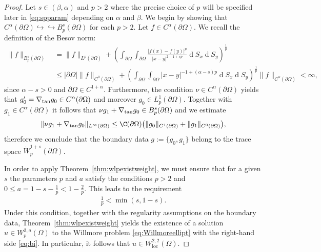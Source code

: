 \documentclass[12pt,a4paper,twoside]{article}
\newcommand{\diff}{\operatorname{d}\!}
\begin{document}
\begin{proof} 
Let $s\in(\beta,\alpha) $ and $p>2$  where the precise choice of $p$ will be specified later in \eqref{eq:spparam} depending on $\alpha$ and $\beta$.
We begin by showing that $C^{\alpha}(\partial\Omega)\hookrightarrow \hookrightarrow B^{s}_p(\partial\Omega)$ for each $p>2$. Let $f\in C^{\alpha}(\partial{\Omega})$. We recall the definition of the Besov norm:
\begin{align*}
 \| f\| _{B^s_p(\partial\Omega)}&\ = \| f\|_{L^p(\partial\Omega)} 
 + \left(\int_{\partial\Omega}\int_{\partial\Omega} \frac{\big| f(x)-f(y) \big|^p}{|x-y|^{2-1+s p}} \diff S_x \diff S_y \right)^\frac{1}{p} \\
 &\ \le | \partial\Omega| \|f\|_{C^0(\partial\Omega)} + 
    \left(\int_{\partial\Omega}\int_{\partial\Omega} |x-y|^{-1+(\alpha-s )p} \diff S_x \diff S_y \right)^\frac{1}{p} \|f \|_{C^\alpha(\partial\Omega)}< \infty,
\end{align*} 
since $\alpha-s > 0$ and $\partial\Omega\in C^{1+\alpha}$. Furthermore, the condition $\nu\in C^{\alpha}(\partial\Omega)$ yields that $g'_0=\nabla_{\rm tan} g_0\in C^\alpha(\partial\Omega)$ and moreover $g_0\in L^1_p(\partial\Omega)$. Together with $g_1\in C^\alpha(\partial\Omega)$ it follows that $\nu g_1+\nabla_{\rm tan} g_0\in B^s _p(\partial\Omega)$ and we estimate 
\begin{align*}
    \|\nu g_1+\nabla_{\rm tan} g_0\|_{L^\infty(\partial\Omega)} \le \C(\partial\Omega)\big( \| g_0\|_{C^1(\partial\Omega)} + \|g_1\|_{C^0(\partial\Omega)} \big),
\end{align*}
therefore we conclude that the boundary data $g:=\{g_0,g_1\}$ belong to the trace space $ \dot W^{1+s }_p(\partial\Omega)$.

In order to apply Theorem~\ref{thm:wlpexistweight}, we must ensure that for a given $s$ the parameters $p$ and $a$ satisfy the conditions $p>2$ and $0\le a=1-s -\frac{1}{p}<1-\frac{2}{p}$. This leads to the requirement
\begin{align} \label{eq:condp}
    \frac{1}{p}< \min\left(s , 1-s\right).
\end{align}
Under this condition, together with the regularity assumptions on the boundary data, Theorem~\ref{thm:wlpexistweight} yields the existence of a solution $u\in W^{2,a}_p(\Omega)$ to the Willmore problem \eqref{eq:Willmoreellipt} with the right-hand side \eqref{eq:bi}. In particular, it follows that $u\in W^{2,2}_{\text{loc}}(\Omega)$.


\end{proof}
\end{document}

